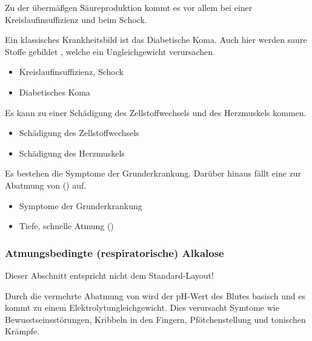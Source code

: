 

{
Zu der übermäßgen Säureproduktion kommt es vor allem bei einer
Kreislaufinsuffizienz und beim Schock.

Ein klassisches Krankheitsbild ist das Diabetische Koma. Auch hier werden saure
Stoffe gebildet , welche ein Ungleichgewicht verursachen. 
}{
\begin{itemize}
    \item Kreislaufinsuffizienz, Schock
    \item Diabetisches Koma
\end{itemize}
}{}{}{}


{
Es kann zu einer Schädigung des Zellstoffwechsels und des Herzmuskels kommen.
}{
\begin{itemize}
    \item Schädigung des Zellstoffwechsels
    \item Schädigung des Herzmuskels
\end{itemize}
}{}{}{}

{
Es bestehen die Symptome der Grunderkrankung. Darüber hinaus fällt eine
 zur Abatmung von  () auf.

}{
\begin{itemize}
    \item Symptome der Grunderkrankung
    \item Tiefe, schnelle Atmung ()
\end{itemize}
}


\subsubsection{Atmungsbedingte (respiratorische) Alkalose}
\label{topic:alkalose-respiratorische}

{Dieser Abschnitt entspricht nicht dem Standard-Layout!}

Durch die vermehrte Abatmung von  wird der
pH-Wert des Blutes basisch und es kommt zu einem Elektrolytungleichgewicht.
Dies verursacht Symtome wie Bewusstseinsstörungen, Kribbeln in den Fingern,
Pfötchenstellung und tonischen Krämpfe. 

